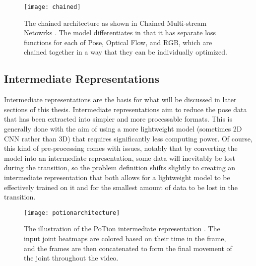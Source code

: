 \begin{figure}[ht]
	\texttt{[image: chained]}
	\centering
	\caption{The chained architecture as shown in Chained Multi-stream Netowrks \cite{Chained}. The model differentiates in that it has separate loss functions for each of Pose, Optical Flow, and RGB, which are chained together in a way that they can be individually optimized.}
	\label{fig:chained}
\end{figure}

\subsection{Intermediate Representations}
\label{sec:intermediate}

Intermediate representations are the basis for what will be discussed in later sections of this thesis. Intermediate representations aim to reduce the pose data that has been extracted into simpler and more processable formats. This is generally done with the aim of using a more lightweight model (sometimes 2D CNN rather than 3D) that requires significantly less computing power. Of course, this kind of pre-processing comes with issues, notably that by converting the model into an intermediate representation, some data will inevitably be lost during the transition, so the problem definition shifts slightly to creating an intermediate representation that both allows for a lightweight model to be effectively trained on it and for the smallest amount of data to be lost in the transition.

\begin{figure}[ht]
	\texttt{[image: potionarchitecture]}
	\centering
	\caption{The illustration of the PoTion intermediate representation \cite{potion}. The input joint heatmaps are colored based on their time in the frame, and the frames are then concatenated to form the final movement of the joint throughout the video.}
	\label{fig:potion-architecture}
\end{figure}

